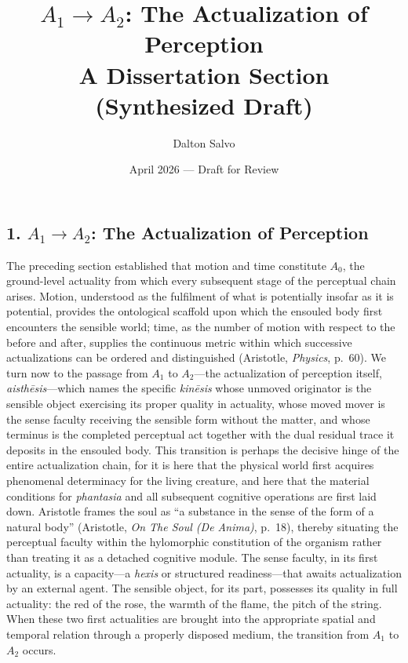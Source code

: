 \documentclass[12pt]{article}
\title{\vspace{-2em}\textbf{$A_1 \to A_2$: The Actualization of Perception}\\[0.5em]
       \large\normalfont A Dissertation Section (Synthesized Draft)}
\author{Dalton Salvo}
\date{April 2026 --- Draft for Review}
\begin{document}
\maketitle
\thispagestyle{fancy}

\subsection*{1. $A_1 \to A_2$: The Actualization of Perception}

The preceding section established that motion and time constitute $A_0$, the ground-level actuality from which every subsequent stage of the perceptual chain arises. Motion, understood as the fulfilment of what is potentially insofar as it is potential, provides the ontological scaffold upon which the ensouled body first encounters the sensible world; time, as the number of motion with respect to the before and after, supplies the continuous metric within which successive actualizations can be ordered and distinguished (Aristotle, \textit{Physics}, p.~60). We turn now to the passage from $A_1$ to $A_2$---the actualization of perception itself, \textit{aisthēsis}---which names the specific \textit{kinēsis} whose unmoved originator is the sensible object exercising its proper quality in actuality, whose moved mover is the sense faculty receiving the sensible form without the matter, and whose terminus is the completed perceptual act together with the dual residual trace it deposits in the ensouled body. This transition is perhaps the decisive hinge of the entire actualization chain, for it is here that the physical world first acquires phenomenal determinacy for the living creature, and here that the material conditions for \textit{phantasia} and all subsequent cognitive operations are first laid down. Aristotle frames the soul as ``a substance in the sense of the form of a natural body'' (Aristotle, \textit{On The Soul (De Anima)}, p.~18), thereby situating the perceptual faculty within the hylomorphic constitution of the organism rather than treating it as a detached cognitive module. The sense faculty, in its first actuality, is a capacity---a \textit{hexis} or structured readiness---that awaits actualization by an external agent. The sensible object, for its part, possesses its quality in full actuality: the red of the rose, the warmth of the flame, the pitch of the string. When these two first actualities are brought into the appropriate spatial and temporal relation through a properly disposed medium, the transition from $A_1$ to $A_2$ occurs.
\end{document}
